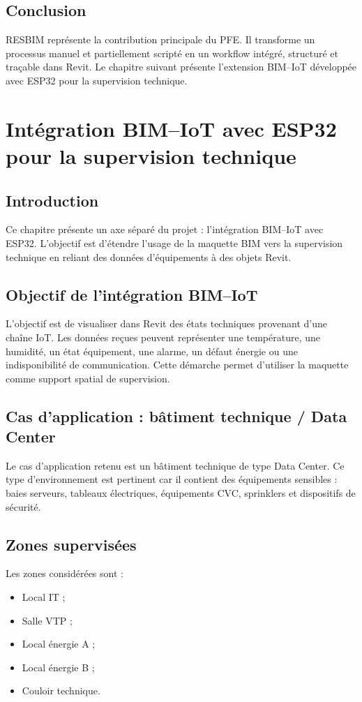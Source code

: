\documentclass[12pt,a4paper]{report}
\begin{document}
\section{Conclusion}
RESBIM représente la contribution principale du PFE. Il transforme un processus manuel et partiellement scripté en un workflow intégré, structuré et traçable dans Revit. Le chapitre suivant présente l'extension BIM--IoT développée avec ESP32 pour la supervision technique.

\chapter{Intégration BIM--IoT avec ESP32 pour la supervision technique}

\section{Introduction}
Ce chapitre présente un axe séparé du projet : l'intégration BIM--IoT avec ESP32. L'objectif est d'étendre l'usage de la maquette BIM vers la supervision technique en reliant des données d'équipements à des objets Revit.

\section{Objectif de l'intégration BIM--IoT}
L'objectif est de visualiser dans Revit des états techniques provenant d'une chaîne IoT. Les données reçues peuvent représenter une température, une humidité, un état équipement, une alarme, un défaut énergie ou une indisponibilité de communication. Cette démarche permet d'utiliser la maquette comme support spatial de supervision.

\section{Cas d'application : bâtiment technique / Data Center}
Le cas d'application retenu est un bâtiment technique de type Data Center. Ce type d'environnement est pertinent car il contient des équipements sensibles : baies serveurs, tableaux électriques, équipements CVC, sprinklers et dispositifs de sécurité.

\section{Zones supervisées}
Les zones considérées sont :
\begin{itemize}[leftmargin=1.2cm]
    \item Local IT ;
    \item Salle VTP ;
    \item Local énergie A ;
    \item Local énergie B ;
    \item Couloir technique.
\end{itemize}
\end{document}
